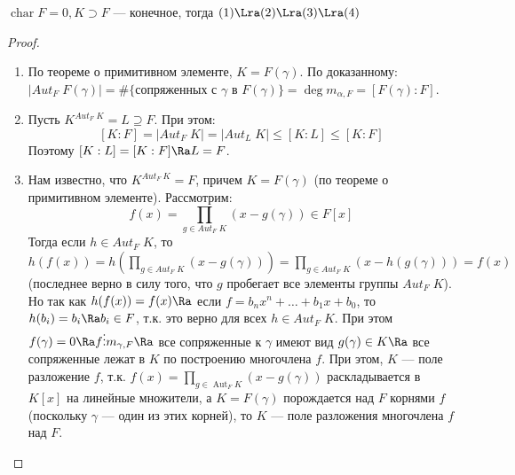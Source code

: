\begin{theorem}
    \(\operatorname{char} F = 0, K \supset F\) --- конечное, тогда \((1) \Lra (2) \Lra (3) \Lra (4)\)
\end{theorem}
\begin{proof}\indent
    \begin{enumerate}
        \item[\((2) \Ra (3)\)] По теореме о примитивном элементе, \(K = F(\gamma)\). По доказанному: \(|Aut_F\;F(\gamma)| = \#\{\text{сопряженных с } \gamma \text{ в }F(\gamma)\} = \deg m_{\alpha, F} = [F(\gamma):F]\).
        \item[\((3) \Ra (4)\)] Пусть \(K^{Aut_F\;K} = L \supseteq F\). При этом:
        \[[K:F] = |Aut_F\;K| = |Aut_L\;K| \le [K:L] \le [K:F]\]
        Поэтому \([K:L] = [K:F] \Ra L = F\).
        \item[\((4) \Ra (1)\)] Нам известно, что \(K^{Aut_F\:K} = F\), причем \(K = F(\gamma)\) (по теореме о примитивном элементе). Рассмотрим:
        \[f(x) = \prod_{g \in Aut_F\;K}(x - g(\gamma)) \in F[x]\]
        Тогда если \(h \in Aut_F\;K\), то \(h(f(x)) = h\left( \prod_{g \in Aut_F\;K}(x - g(\gamma)) \right) = \prod_{g \in Aut_F\;K}(x - h(g(\gamma))) = f(x)\) (последнее верно в силу того, что \(g\) пробегает все элементы группы \(Aut_F\;K\)). Но так как \(h(f(x)) = f(x) \Ra\) если \(f = b_nx^n + \dots + b_1x + b_0\), то \(h(b_i) = b_i \Ra b_i \in F\), т.к. это верно для всех \(h \in Aut_F\;K\). При этом \(f(\gamma) = 0 \Ra f \vdots m_{\gamma, F} \Ra\) все сопряженные к \(\gamma\) имеют вид \(g(\gamma) \in K \Ra \) все сопряженные лежат в \(K\) по построению многочлена \(f\). При этом, \(K\) --- поле разложение \(f\), т.к. \(f(x) = \prod_{g \in \operatorname{Aut}_F K} (x - g(\gamma))\) раскладывается в \(K[x]\) на линейные множители, а \(K = F(\gamma)\) порождается над \(F\) корнями \(f\) (поскольку \(\gamma\) — один из этих корней), то \(K\) — поле разложения многочлена \(f\) над \(F\).


\end{enumerate}
\end{proof}
